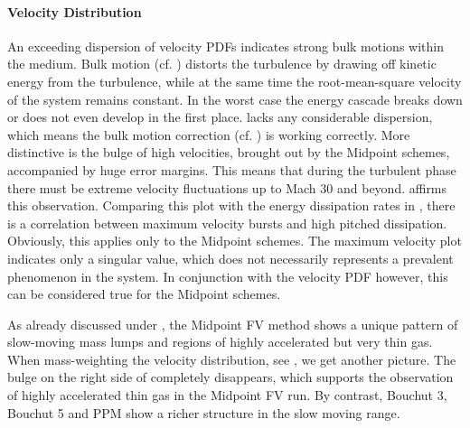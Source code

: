 \paragraph{Velocity Distribution}
An exceeding dispersion of velocity PDFs indicates strong bulk motions within
the medium. Bulk motion (cf. ) distorts the turbulence by
drawing off kinetic energy from the turbulence, while at the same time the
root-mean-square velocity of the system remains constant. In the worst case the
energy cascade breaks down or does not even develop in the first place.
 lacks any considerable
dispersion, which means the bulk motion correction (cf.
) is working correctly. More distinctive is
the bulge of high velocities, brought out by the Midpoint schemes,
accompanied by huge error margins. This means that during the turbulent phase
there must be extreme velocity fluctuations up to Mach 30 and beyond.
 affirms this observation.
Comparing this plot with the energy dissipation rates in
, there is a correlation
between maximum velocity bursts and high pitched dissipation. Obviously, this
applies only to the Midpoint schemes. The maximum velocity plot indicates only
a singular value, which does not necessarily represents a prevalent phenomenon in
the system. In conjunction with the velocity PDF however, this can be considered
true for the Midpoint schemes.

As already discussed under , the Midpoint FV method
shows a unique pattern of slow-moving mass lumps and regions of highly
accelerated but very thin gas. When mass-weighting the velocity distribution,
see , we get another picture.
The bulge on the right side of 
completely disappears, which supports the observation of highly accelerated thin
gas in the Midpoint FV run. By contrast, Bouchut 3, Bouchut 5 and PPM show
a richer structure in the slow moving range.

